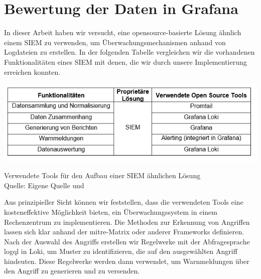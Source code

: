 \section{Bewertung der Daten in Grafana}


In dieser Arbeit haben wir versucht, eine \gls{opensource}-basierte Lösung ähnlich einem \gls{SIEM} zu verwenden, um Überwachungsmechanismen anhand von Logdateien zu erstellen. In der folgenden Tabelle vergleichen wir die vorhandenen Funktionalitäten eines \gls{SIEM} mit denen, die wir durch unsere Implementierung erreichen konnten.

\begin{table}[H]
    \includegraphics[width=\linewidth]{assets/tabelle_siem_BA.png}
    \caption{Verwendete Tools für den Aufbau einer \gls{SIEM} ähnlichen Lösung\\Quelle: Eigene Quelle und \citep{Granadillo_SIEM}}
 \end{table}
 

Aus prinzipieller Sicht können wir feststellen, dass die verwendeten Tools eine kosteneffektive Möglichkeit bieten, ein Überwachungssystem in einem Rechenzentrum zu implementieren. Die Methoden zur Erkennung von Angriffen lassen sich klar anhand der \gls{mitre}-Matrix oder anderer Frameworks definieren. Nach der Auswahl des Angriffs erstellen wir Regelwerke mit der Abfragesprache \gls{logql} in Loki, um Muster zu identifizieren, die auf den ausgewählten Angriff hindeuten. Diese Regelwerke werden dann verwendet, um Warnmeldungen über den Angriff zu generieren und zu versenden.

